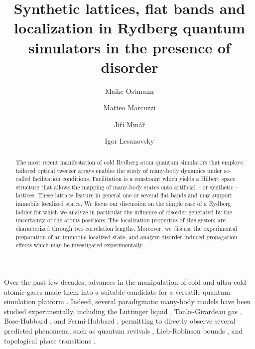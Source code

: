 \documentclass[prl,aps,twocolumn,showpacs,superscriptaddress,longbibliography]{revtex4-1}
\begin{document}
\title{Synthetic lattices, flat bands and localization in Rydberg quantum simulators in the presence of disorder}

\author{Maike Ostmann}
\author{Matteo Marcuzzi}
\author{Ji\v{r}\'{i} Min\'{a}\v{r}}
\author{Igor Lesanovsky}



\begin{abstract}
The most recent manifestation of cold Rydberg atom quantum simulators that employs tailored optical tweezer arrays enables the study of many-body dynamics under so-called facilitation conditions. Facilitation is a constraint which yields a Hilbert space structure that allows the mapping of many-body states onto artificial -- or synthetic -- lattices. These lattices feature in general one or several flat bands and may support immobile localized states. We focus our discussion on the simple case of a Rydberg ladder for which we analyze in particular the influence of disorder generated by the uncertainty of the atoms positions. The localization properties of this system are characterized through two correlation lengths. Moreover, we discuss the experimental preparation of an immobile localized state, and analyze disorder-induced propagation effects which may be investigated experimentally.
\end{abstract}
\pacs{}
\maketitle


Over the past few decades, advances in the manipulation of cold and ultra-cold atomic gases made them into a suitable candidate for a versatile quantum simulation platform \cite{Bloch_2008,Bloch_2012}. Indeed, several paradigmatic many-body models have been studied experimentally, including the Luttinger liquid \cite{hofferberth2007}, Tonks-Girardeau gas \cite{kinoshita2004}, Bose-Hubbard \cite{greiner2002, greiner2003}, and Fermi-Hubbard \cite{Kohl2005}, permitting to directly observe several predicted phenomena, such as quantum revivals \cite{greiner2002_revival}, Lieb-Robinson bounds \cite{cheneau2012}, and topological phase transitions \cite{hadzibabic2006}.
\end{document}
